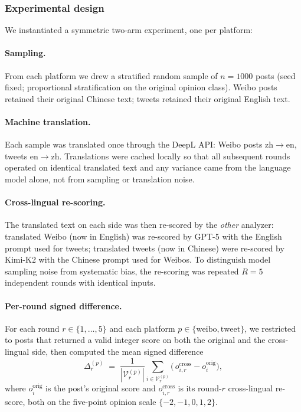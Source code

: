 \subsubsection{Experimental design}

We instantiated a symmetric two-arm experiment, one per platform:

\paragraph{Sampling.} From each platform we drew a stratified random
sample of $n = 1000$ posts (seed fixed; proportional stratification on
the original opinion class). Weibo posts retained their original
Chinese text; tweets retained their original English text.

\paragraph{Machine translation.} Each sample was translated once
through the DeepL API: Weibo posts zh$\rightarrow$en, tweets
en$\rightarrow$zh. Translations were cached locally so that all
subsequent rounds operated on identical translated text and any
variance came from the language model alone, not from sampling or
translation noise.

\paragraph{Cross-lingual re-scoring.} The translated text on each side
was then re-scored by the \emph{other} analyzer:
translated Weibo (now in English) was re-scored by GPT-5 with the
English prompt used for tweets; translated tweets (now in Chinese) were
re-scored by Kimi-K2 with the Chinese prompt used for Weibos. To
distinguish model sampling noise from systematic bias, the re-scoring
was repeated $R = 5$ independent rounds with identical inputs.

\paragraph{Per-round signed difference.} For each round $r \in
\{1,\dots,5\}$ and each platform $p \in \{\text{weibo},
\text{tweet}\}$, we restricted to posts that returned a valid integer
score on both the original and the cross-lingual side, then computed
the mean signed difference
\begin{equation*}
\Delta^{(p)}_r \;=\; \frac{1}{|\mathcal{V}^{(p)}_r|} \sum_{i \in
\mathcal{V}^{(p)}_r} \bigl(\,o^{\text{cross}}_{i,r} -
o^{\text{orig}}_i\bigr),
\end{equation*}
where $o^{\text{orig}}_i$ is the post's original score and
$o^{\text{cross}}_{i,r}$ is its round-$r$ cross-lingual re-score, both
on the five-point opinion scale $\{-2,-1,0,1,2\}$.

